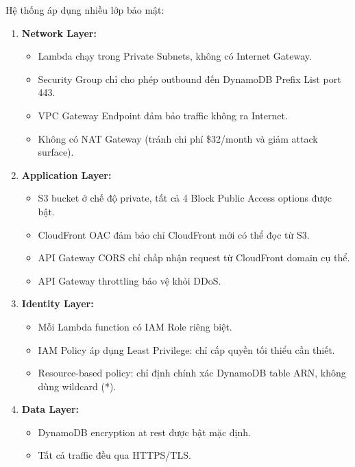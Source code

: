 Hệ thống áp dụng nhiều lớp bảo mật:

\begin{enumerate}
    \item \textbf{Network Layer:}
    \begin{itemize}
        \item Lambda chạy trong Private Subnets, không có Internet Gateway.
        \item Security Group chỉ cho phép outbound đến DynamoDB Prefix List port 443.
        \item VPC Gateway Endpoint đảm bảo traffic không ra Internet.
        \item Không có NAT Gateway (tránh chi phí \$32/month và giảm attack surface).
    \end{itemize}
    
    \item \textbf{Application Layer:}
    \begin{itemize}
        \item S3 bucket ở chế độ private, tất cả 4 Block Public Access options được bật.
        \item CloudFront OAC đảm bảo chỉ CloudFront mới có thể đọc từ S3.
        \item API Gateway CORS chỉ chấp nhận request từ CloudFront domain cụ thể.
        \item API Gateway throttling bảo vệ khỏi DDoS.
    \end{itemize}
    
    \item \textbf{Identity Layer:}
    \begin{itemize}
        \item Mỗi Lambda function có IAM Role riêng biệt.
        \item IAM Policy áp dụng Least Privilege: chỉ cấp quyền tối thiểu cần thiết.
        \item Resource-based policy: chỉ định chính xác DynamoDB table ARN, không dùng wildcard (*).
    \end{itemize}
    
    \item \textbf{Data Layer:}
    \begin{itemize}
        \item DynamoDB encryption at rest được bật mặc định.
        \item Tất cả traffic đều qua HTTPS/TLS.
    \end{itemize}
\end{enumerate}


